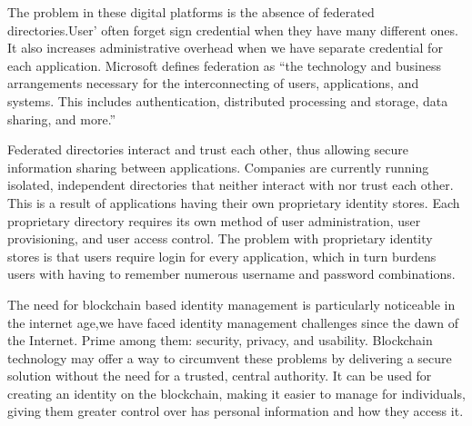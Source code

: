 The problem in these digital platforms is the absence of federated directories.User' often forget sign credential when they have many different ones. It also increases administrative overhead when we have separate credential for each application. Microsoft defines federation as “the technology and business arrangements necessary for the interconnecting of users, applications, and systems. This includes
authentication, distributed processing and storage, data sharing, and more\citep{IdentityManagement}.”

Federated directories interact and trust each other, thus allowing secure information sharing between applications. Companies are currently running isolated, independent directories that neither interact with nor trust each other.
This is a result of applications having their own proprietary identity stores. Each
proprietary directory requires its own method of user administration, user
provisioning, and user access control. The problem with proprietary identity stores is that users require login for every application, which in turn burdens users with having to remember numerous username and password combinations.

The need for blockchain based identity management is particularly noticeable in the internet age,we have faced identity management challenges since the dawn of the Internet. Prime among them: security, privacy, and usability\citep{Blockchain}.
Blockchain technology may offer a way to circumvent these problems by delivering a secure solution without the need for a trusted, central authority. It can be used for creating an identity on the blockchain, making it easier to manage for individuals, giving them greater control over has personal information and how they access it.
